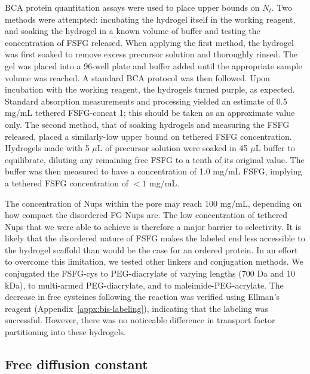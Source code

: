  BCA protein quantitation assays were used to place upper bounds on $N_t$.  Two methods were attempted: incubating the hydrogel itself in the working reagent, and soaking the hydrogel in a known volume of buffer and testing the concentration of FSFG released.  When applying the first method, the hydrogel was first soaked to remove excess precursor solution and thoroughly rinsed.  The gel was placed into a 96-well plate and buffer added until the appropriate sample volume was reached.  A standard BCA protocol was then followed.  Upon incubation with the working reagent, the hydrogels turned purple, as expected.  Standard absorption measurements and processing yielded an estimate of 0.5 mg/mL tethered FSFG-concat 1; this should be taken as an approximate value only.  The second method, that of soaking hydrogels and measuring the FSFG released, placed a similarly-low upper bound on tethered FSFG concentration.  Hydrogels made with 5 $\mu$L of precursor solution were soaked in 45 $\mu$L buffer to equilibrate, diluting any remaining free FSFG to a tenth of its original value.  The buffer was then measured to have a concentration of 1.0 mg/mL FSFG, implying a tethered FSFG concentration of $<1$ mg/mL.

The concentration of Nups within the pore may reach 100 mg/mL, depending on how compact the disordered FG Nups are.  The low concentration of tethered Nups that we were able to achieve is therefore a major barrier to selectivity.  It is likely that the disordered nature of FSFG makes the labeled end less accessible to the hydrogel scaffold than would be the case for an ordered protein.  In an effort to overcome this limitation, we tested other linkers and conjugation methods.  We conjugated the FSFG-cys to PEG-diacrylate of varying lengths (700 Da and 10 kDa), to multi-armed PEG-diacrylate, and to maleimide-PEG-acrylate.  The decrease in free cysteines following the reaction was verified using Ellman's reagent (Appendix~\ref{appx:bis-labeling}), indicating that the labeling was successful.  However, there was no noticeable difference in transport factor partitioning into these hydrogels.

\subsection{Free diffusion constant}

